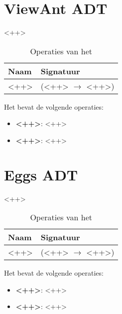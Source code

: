 \section{View\textunderscore Ant ADT}
\label{section:view_ant}

<++>

\begin{table}[hbt]
\centering
\begin{tabular}{|ll|}
\hline
\rowcolor[HTML]{000000} 
{\color[HTML]{FFFFFF} \textbf{Naam}} & {\color[HTML]{FFFFFF} \textbf{Signatuur}} \\ \hline
<++>                                 & (<++> $\rightarrow$ <++>)                                       \\ \hline
\end{tabular}
\caption{Operaties van het \texttt{}}
\label{table:view_ant}
\end{table}

Het \texttt{} bevat de volgende operaties:

\begin{itemize}
	\item \textbf{<++>}: <++>
	\item \textbf{<++>}: <++>
\end{itemize}

\section{Eggs ADT}
\label{section:eggs}

<++>

\begin{table}[hbt]
\centering
\begin{tabular}{|ll|}
\hline
\rowcolor[HTML]{000000} 
{\color[HTML]{FFFFFF} \textbf{Naam}} & {\color[HTML]{FFFFFF} \textbf{Signatuur}} \\ \hline
<++>                                 & (<++> $\rightarrow$ <++>)                                       \\ \hline
\end{tabular}
\caption{Operaties van het \texttt{}}
\label{table:eggs}
\end{table}

Het \texttt{} bevat de volgende operaties:

\begin{itemize}
	\item \textbf{<++>}: <++>
	\item \textbf{<++>}: <++>
\end{itemize}

